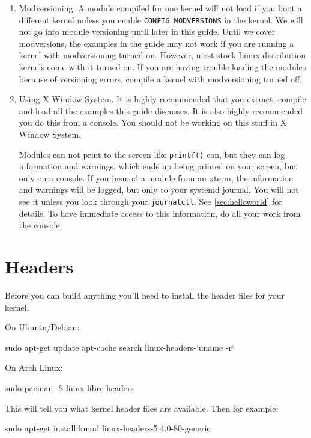 \documentclass[10pt, oneside]{book}
\begin{document}
\begin{enumerate}
  \item Modversioning.
        A module compiled for one kernel will not load if you boot a different kernel unless you enable \verb|CONFIG_MODVERSIONS| in the kernel.
        We will not go into module versioning until later in this guide.
        Until we cover modversions, the examples in the guide may not work if you are running a kernel with modversioning turned on.
        However, most stock Linux distribution kernels come with it turned on.
        If you are having trouble loading the modules because of versioning errors, compile a kernel with modversioning turned off.

  \item Using X Window System.
        It is highly recommended that you extract, compile and load all the examples this guide discusses.
        It is also highly recommended you do this from a console.
        You should not be working on this stuff in X Window System.

        Modules can not print to the screen like \verb|printf()| can, but they can log information and warnings, which ends up being printed on your screen, but only on a console.
        If you insmod a module from an xterm, the information and warnings will be logged, but only to your systemd journal.
        You will not see it unless you look through your \verb|journalctl|.
        See \ref{sec:helloworld} for details.
        To have immediate access to this information, do all your work from the console.
\end{enumerate}

\section{Headers}
\label{sec:headers}
Before you can build anything you'll need to install the header files for your kernel.

On Ubuntu/Debian:
\begin{codebash}
sudo apt-get update
apt-cache search linux-headers-`uname -r`
\end{codebash}

On Arch Linux:
\begin{codebash}
sudo pacman -S linux-libre-headers
\end{codebash}

This will tell you what kernel header files are available.
Then for example:
\begin{codebash}
sudo apt-get install kmod linux-headers-5.4.0-80-generic
\end{codebash}
\end{document}
